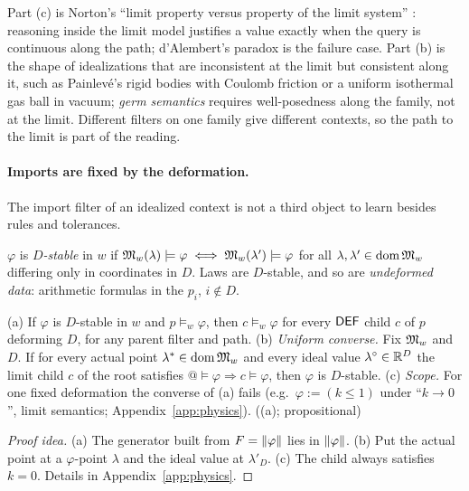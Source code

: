 Part (c) is Norton's ``limit property versus property of the limit system''
\citep{norton2012approximation}: reasoning inside the limit model justifies a value
exactly when the query is continuous along the path; d'Alembert's paradox is the
failure case. Part (b) is the shape of idealizations that are inconsistent at the limit
but consistent along it, such as Painlevé's rigid bodies with Coulomb friction
\citep{stewart2000rigid} or a uniform isothermal gas ball in vacuum; \emph{germ semantics}
requires well-posedness along the family, not at the limit. Different filters on one
family give different contexts, so the path to the limit is part of the reading.

\paragraph{Imports are fixed by the deformation.} The import filter of an idealized
context is not a third object to learn besides rules and tolerances.

\begin{definition}[Stability]\label{def:physics:stable}
$\varphi$ is \emph{$D$-stable} in $w$ if $\mathfrak{M}_w(\lambda)\models\varphi\iff\mathfrak{M}_w(\lambda')\models\varphi$
for all $\lambda,\lambda'\in\operatorname{dom}\mathfrak{M}_w$ differing only in coordinates in $D$. Laws are
$D$-stable, and so are \emph{undeformed data}: arithmetic formulas in the $p_i$, $i\notin D$.
\end{definition}

\begin{lemma}\label{lem:physics:import}
\textup{(a)} If $\varphi$ is $D$-stable in $w$ and $p\models_w\varphi$, then $c\models_w\varphi$
for every $\mathsf{DEF}$ child $c$ of $p$ deforming $D$, for any parent filter and path.
\textup{(b)} \emph{Uniform converse.} Fix $\mathfrak{M}_w$ and $D$. If for every actual point
$\lambda^*\in\operatorname{dom}\mathfrak{M}_w$ and every ideal value $\lambda^\circ\in\mathbb{R}^D$ the limit child $c$ of
the root satisfies $@\models\varphi\Rightarrow c\models\varphi$, then $\varphi$ is $D$-stable.
\textup{(c)} \emph{Scope.} For one fixed deformation the converse of (a) fails (e.g.\
$\varphi:=(k\le1)$ under ``$k\to0$'', limit semantics; Appendix~\ref{app:physics}).
\hfill\leanok{Contexts.import\_sound} ((a); propositional)
\end{lemma}
\begin{proof}[Proof idea]
(a) The generator built from $F=\lVert \varphi\rVert$ lies in $\lVert \varphi\rVert$. (b) Put the actual
point at a $\varphi$-point $\lambda$ and the ideal value at $\lambda'_D$. (c) The child always
satisfies $k=0$. Details in Appendix~\ref{app:physics}.
\end{proof}

